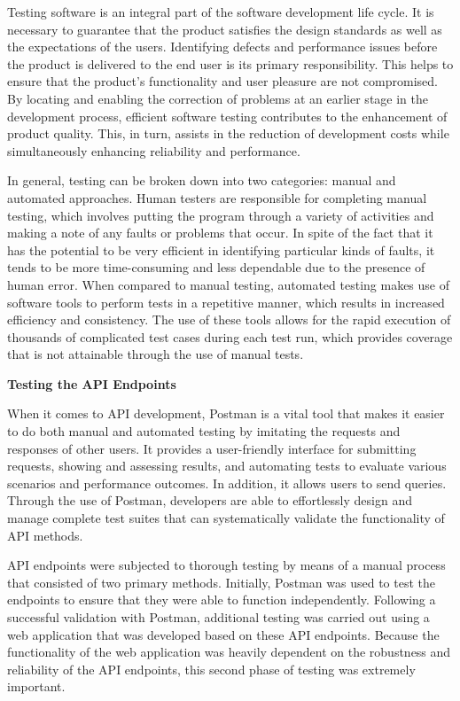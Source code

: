 Testing software is an integral part of the software development life cycle. It is necessary to guarantee that the product satisfies the design standards as well as the expectations of the users. Identifying defects and performance issues before the product is delivered to the end user is its primary responsibility. This helps to ensure that the product's functionality and user pleasure are not compromised. By locating and enabling the correction of problems at an earlier stage in the development process, efficient software testing contributes to the enhancement of product quality. This, in turn, assists in the reduction of development costs while simultaneously enhancing reliability and performance. \cite{whatIsSoftwareTesting1}

In general, testing can be broken down into two categories: manual and automated approaches. Human testers are responsible for completing manual testing, which involves putting the program through a variety of activities and making a note of any faults or problems that occur. In spite of the fact that it has the potential to be very efficient in identifying particular kinds of faults, it tends to be more time-consuming and less dependable due to the presence of human error. When compared to manual testing, automated testing makes use of software tools to perform tests in a repetitive manner, which results in increased efficiency and consistency. The use of these tools allows for the rapid execution of thousands of complicated test cases during each test run, which provides coverage that is not attainable through the use of manual tests. \cite{whatIsSoftwareTesting2}

\noindent\textbf{Testing the API Endpoints}

When it comes to API development, Postman is a vital tool that makes it easier to do both manual and automated testing by imitating the requests and responses of other users. It provides a user-friendly interface for submitting requests, showing and assessing results, and automating tests to evaluate various scenarios and performance outcomes. In addition, it allows users to send queries. Through the use of Postman, developers are able to effortlessly design and manage complete test suites that can systematically validate the functionality of API methods. \cite{postman}

API endpoints were subjected to thorough testing by means of a manual process that consisted of two primary methods. Initially, Postman was used to test the endpoints to ensure that they were able to function independently. Following a successful validation with Postman, additional testing was carried out using a web application that was developed based on these API endpoints. Because the functionality of the web application was heavily dependent on the robustness and reliability of the API endpoints, this second phase of testing was extremely important. 

